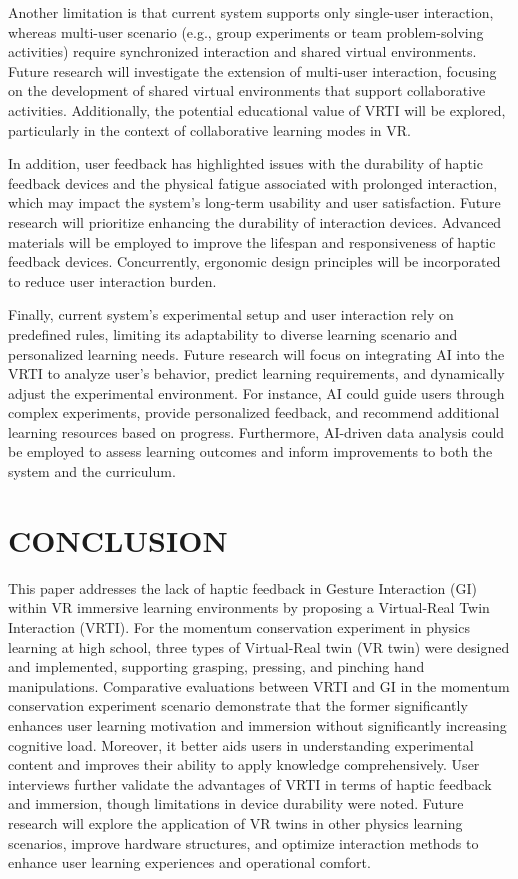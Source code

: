 \documentclass[runningheads]{llncs}
\begin{document}
Another limitation is that current system supports only single-user interaction, whereas multi-user scenario (e.g., group experiments or team problem-solving activities) require synchronized interaction and shared virtual environments. Future research will investigate the extension of multi-user interaction, focusing on the development of shared virtual environments that support collaborative activities. Additionally, the potential educational value of VRTI will be explored, particularly in the context of collaborative learning modes in VR.

In addition, user feedback has highlighted issues with the durability of haptic feedback devices and the physical fatigue associated with prolonged interaction, which may impact the system's long-term usability and user satisfaction. Future research will prioritize enhancing the durability of interaction devices. Advanced materials will be employed to improve the lifespan and responsiveness of haptic feedback devices. Concurrently, ergonomic design principles will be incorporated to reduce user interaction burden.

Finally, current system's experimental setup and user interaction rely on predefined rules, limiting its adaptability to diverse learning scenario and personalized learning needs. Future research will focus on integrating AI into the VRTI to analyze user's behavior, predict learning requirements, and dynamically adjust the experimental environment. For instance, AI could guide users through complex experiments, provide personalized feedback, and recommend additional learning resources based on progress. Furthermore, AI-driven data analysis could be employed to assess learning outcomes and inform improvements to both the system and the curriculum.

\section{CONCLUSION}
This paper addresses the lack of haptic feedback in Gesture Interaction (GI) within VR immersive learning environments by proposing a Virtual-Real Twin Interaction (VRTI). For the momentum conservation experiment in physics learning at high school, three types of Virtual-Real twin (VR twin) were designed and implemented, supporting grasping, pressing, and pinching hand manipulations. Comparative evaluations between VRTI and GI in the momentum conservation experiment scenario demonstrate that the former significantly enhances user learning motivation and immersion without significantly increasing cognitive load. Moreover, it better aids users in understanding experimental content and improves their ability to apply knowledge comprehensively. User interviews further validate the advantages of VRTI in terms of haptic feedback and immersion, though limitations in device durability were noted. Future research will explore the application of VR twins in other physics learning scenarios, improve hardware structures, and optimize interaction methods to enhance user learning experiences and operational comfort.
\end{document}
